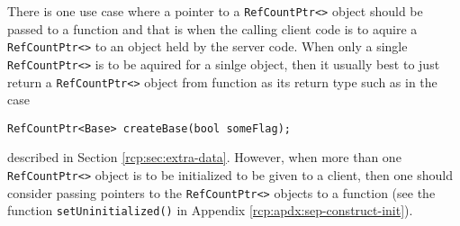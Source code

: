 There is one use case where a pointer to a {}\texttt{Ref\-Count\-Ptr<>}
object should be passed to a function and that is when the calling
client code is to aquire a {}\texttt{Ref\-Count\-Ptr<>} to an object held
by the server code.  When only a single {}\texttt{Ref\-Count\-Ptr<>} is to
be aquired for a sinlge object, then it usually best to just return
a {}\texttt{Ref\-Count\-Ptr<>} object from function as its return type
such as in the case
%
{\scriptsize\begin{verbatim}
RefCountPtr<Base> createBase(bool someFlag);
\end{verbatim}}
%
{}\noindent{}described in Section {}\ref{rcp:sec:extra-data}.
However, when more than one {}\texttt{Ref\-Count\-Ptr<>} object is to
be initialized to be given to a client, then one should consider
passing pointers to the {}\texttt{Ref\-Count\-Ptr<>} objects to a
function (see the function {}\texttt{setUninitialized()} in Appendix
{}\ref{rcp:apdx:sep-construct-init}).
